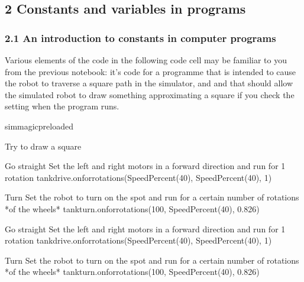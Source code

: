 \documentclass[letterpaper,10pt,english]{sphinxmanual}
\begin{document}
{\subsection{2 Constants and variables in programs}
\label{\detokenize{content/01_Robot_Lab/Section_00_02:2-Constants-and-variables-in-programs}}\label{\detokenize{content/01_Robot_Lab/Section_00_02::doc}}

\subsubsection{2.1 An introduction to constants in computer programs}
\label{\detokenize{content/01_Robot_Lab/Section_00_02:2.1-An-introduction-to-constants-in-computer-programs}}
Various elements of the code in the following code cell may be familiar to you from the previous notebook: it’s code for a programme that is intended to cause the robot to traverse a square path in the simulator, and and that should allow the simulated robot to draw something approximating a square if you check the  setting when the program runs.

{
\begin{sphinxVerbatim}[commandchars=\\\{\}]
\llap{\color{nbsphinxin}[ ]:\,\hspace{\fboxrule}\hspace{\fboxsep}}\PYGZpc{}\PYGZpc{}sim\PYGZus{}magic\PYGZus{}preloaded

\PYGZsh{} Try to draw a square

\PYGZsh{}Go straight
\PYGZsh{} Set the left and right motors in a forward direction
\PYGZsh{} and run for 1 rotation
tank\PYGZus{}drive.on\PYGZus{}for\PYGZus{}rotations(SpeedPercent(40), SpeedPercent(40), 1)

\PYGZsh{}Turn
\PYGZsh{} Set the robot to turn on the spot
\PYGZsh{} and run for a certain number of rotations *of the wheels*
tank\PYGZus{}turn.on\PYGZus{}for\PYGZus{}rotations(\PYGZhy{}100, SpeedPercent(40), 0.826)

\PYGZsh{}Go straight
\PYGZsh{} Set the left and right motors in a forward direction
\PYGZsh{} and run for 1 rotation
tank\PYGZus{}drive.on\PYGZus{}for\PYGZus{}rotations(SpeedPercent(40), SpeedPercent(40), 1)

\PYGZsh{}Turn
\PYGZsh{} Set the robot to turn on the spot
\PYGZsh{} and run for a certain number of rotations *of the wheels*
tank\PYGZus{}turn.on\PYGZus{}for\PYGZus{}rotations(\PYGZhy{}100, SpeedPercent(40), 0.826)


\end{sphinxVerbatim}}}
\end{document}
